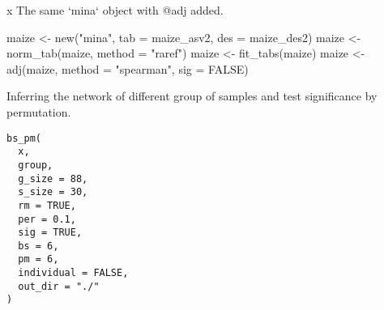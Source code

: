 \documentclass[a4paper]{book}
\begin{document}
%
\begin{Value}
x The same `mina` object with @adj added.
\end{Value}
%
\begin{Examples}
\begin{ExampleCode}
maize <- new("mina", tab = maize_asv2, des = maize_des2)
maize <- norm_tab(maize, method = "raref")
maize <- fit_tabs(maize)
maize <- adj(maize, method = "spearman", sig = FALSE)
\end{ExampleCode}
\end{Examples}
%
\begin{Description}\relax
Inferring the network of different group of samples and test significance by
permutation.
\end{Description}
%
\begin{Usage}
\begin{verbatim}
bs_pm(
  x,
  group,
  g_size = 88,
  s_size = 30,
  rm = TRUE,
  per = 0.1,
  sig = TRUE,
  bs = 6,
  pm = 6,
  individual = FALSE,
  out_dir = "./"
)
\end{verbatim}
\end{Usage}
%
\end{document}
